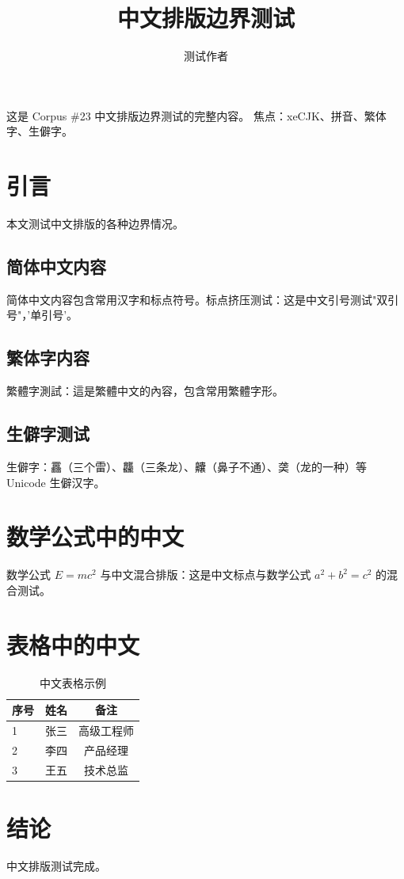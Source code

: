 \documentclass{ctexart}
\title{中文排版边界测试}
\author{测试作者}
\begin{document}
\maketitle

\begin{abstrct}
这是 Corpus \#23 中文排版边界测试的完整内容。
焦点：xeCJK、拼音、繁体字、生僻字。
\end{abstrct}

\section{引言}

本文测试中文排版的各种边界情况。

\subsection{简体中文内容}

简体中文内容包含常用汉字和标点符号。标点挤压测试：这是中文引号测试"双引号"，'单引号'。

\subsection{繁体字内容}

繁體字測試：這是繁體中文的內容，包含常用繁體字形。

\subsection{生僻字测试}

生僻字：靐（三个雷）、龘（三条龙）、齉（鼻子不通）、䶮（龙的一种）等 Unicode 生僻汉字。

\section{数学公式中的中文}

数学公式 $E = mc^2$ 与中文混合排版：这是中文标点与数学公式 $a^2 + b^2 = c^2$ 的混合测试。

\section{表格中的中文}

\begin{table}[ht]
\centering
\caption{中文表格示例}
\label{tab:chinese}
\begin{tabular}{lcc}
  \toprule
  序号 & 姓名 & 备注 \\
  \midrule
  1 & 张三 & 高级工程师 \\
  2 & 李四 & 产品经理 \\
  3 & 王五 & 技术总监 \\
  \bottomrule
\end{tabular}
\end{table}

\section{结论}

中文排版测试完成。



\end{document}
